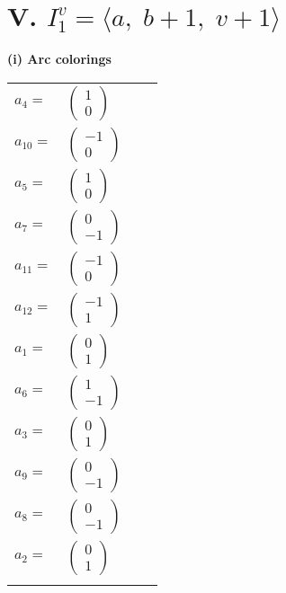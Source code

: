 \documentclass[1p]{elsarticle_modified}
\theoremstyle{definition}
\begin{document}
\centering \section*{V. $I^v_{1}= \langle a,\;b+1,\;v+1 \rangle$}
\flushleft \textbf{(i) Arc colorings}\\
\begin{tabular}{m{7pt} m{180pt} m{7pt} m{180pt} }
\flushright $a_{4}=$&$\begin{pmatrix}1\\0\end{pmatrix}$ \\
\flushright $a_{10}=$&$\begin{pmatrix}-1\\0\end{pmatrix}$ \\
\flushright $a_{5}=$&$\begin{pmatrix}1\\0\end{pmatrix}$ \\
\flushright $a_{7}=$&$\begin{pmatrix}0\\-1\end{pmatrix}$ \\
\flushright $a_{11}=$&$\begin{pmatrix}-1\\0\end{pmatrix}$ \\
\flushright $a_{12}=$&$\begin{pmatrix}-1\\1\end{pmatrix}$ \\
\flushright $a_{1}=$&$\begin{pmatrix}0\\1\end{pmatrix}$ \\
\flushright $a_{6}=$&$\begin{pmatrix}1\\-1\end{pmatrix}$ \\
\flushright $a_{3}=$&$\begin{pmatrix}0\\1\end{pmatrix}$ \\
\flushright $a_{9}=$&$\begin{pmatrix}0\\-1\end{pmatrix}$ \\
\flushright $a_{8}=$&$\begin{pmatrix}0\\-1\end{pmatrix}$ \\
\flushright $a_{2}=$&$\begin{pmatrix}0\\1\end{pmatrix}$\\&\end{tabular}
\end{document}
